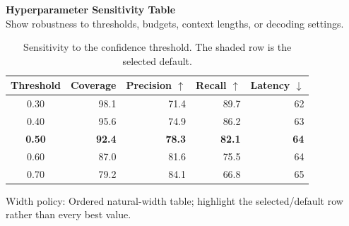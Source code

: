 \documentclass[10pt]{article}
\begin{document}
{\large\textbf{Hyperparameter Sensitivity Table}}\\[-0.05em]
{\footnotesize\textcolor{GroupText}{Show robustness to thresholds, budgets, context lengths, or decoding settings.}}\\[0.35em]
\begin{table}[H]
\centering
\caption{Sensitivity to the confidence threshold. The shaded row is the selected default.}
\label{tab:sensitivity}
\small
\begin{tabular}{@{}crrrr@{}}
\toprule
\rowcolor{HeaderTint}
\textbf{Threshold} & \textbf{Coverage} & \textbf{Precision $\uparrow$} &
\textbf{Recall $\uparrow$} & \textbf{Latency $\downarrow$} \\
\midrule
0.30 & 98.1 & 71.4 & 89.7 & 62 \\
0.40 & 95.6 & 74.9 & 86.2 & 63 \\
\rowcolor{FocusRow}
\textbf{0.50} & \textbf{92.4} & \textbf{78.3} & \textbf{82.1} & \textbf{64} \\
0.60 & 87.0 & 81.6 & 75.5 & 64 \\
0.70 & 79.2 & 84.1 & 66.8 & 65 \\
\bottomrule
\end{tabular}
\end{table}
\vfill
{\footnotesize\textcolor{GroupText}{Width policy: Ordered natural-width table; highlight the selected/default row rather than every best value.}}
\end{document}
